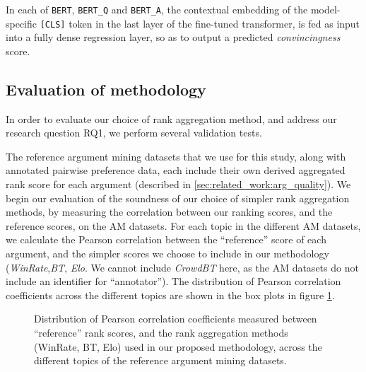 \documentclass[notitlepage,12pt]{jedm}
\begin{document}
In each of \verb|BERT|, \verb|BERT_Q| and \verb|BERT_A|, the contextual 
embedding of the model-specific \verb|[CLS]| token in the last layer of the 
fine-tuned transformer, is fed as input into a fully dense regression layer, so 
as to output a predicted \textit{convincingness} score.

 
\subsection{Evaluation of methodology}\label{sec:methodology_eval}

In order to evaluate our choice of rank aggregation method, and address our 
research question RQ1, we perform several validation tests.

The reference argument mining datasets that we use for this study, along 
with annotated pairwise preference data, each include their own derived 
aggregated rank score for each argument (described in 
\ref{sec:related_work:arg_quality}).
We begin our evaluation of the soundness of our choice of simpler rank 
aggregation methods, by measuring the correlation between our ranking scores, 
and the reference scores, on the AM datasets.
For each topic in the different AM datasets, we calculate the Pearson 
correlation between the ``reference'' score of each argument, and the simpler 
scores we choose to include in our methodology (\textit{WinRate},\textit{BT}, 
\textit{Elo}. We cannot include \textit{CrowdBT} here, as the AM datasets do 
not include an identifier for ``annotator'').
The distribution of Pearson correlation coefficients across the different 
topics are shown in the box plots in figure \ref{fig:corr_to_reference_score}.

\begin{figure}[H]
	\centering
	\scalebox{0.5}{}
	\caption{Distribution of Pearson correlation coefficients measured between 
		``reference'' rank scores, and the rank aggregation methods (WinRate, 
		BT, 
		Elo) used in our proposed methodology, across the different topics of 
		the 
		reference argument mining datasets.}
	\label{fig:corr_to_reference_score}
\end{figure}
\end{document}
